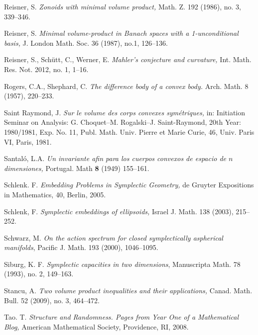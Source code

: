 \documentclass{icmart}
\theoremstyle{definition}
\begin{document}
\begin{thebibliography}{7}
 Reisner, S. {\it Zonoids with minimal volume product,} Math.
Z. 192 (1986), no. 3, 339--346.

 Reisner, S. {\it Minimal volume-product in Banach spaces with a
1-unconditional basis,} J. London Math. Soc. 36 (1987),  no.1, 126--136.

 Reisner, S., Sch\"utt, C., Werner, E. {\it Mahler's conjecture and curvature,}
Int. Math. Res. Not.  2012, no. 1, 1--16. 


 Rogers, C.A., Shephard, C. {\it The difference
body of a convex body.} Arch. Math. 8 (1957), 220--233.


 Saint Raymond, J. {\it Sur le volume des corps convexes
sym\'etriques,} in:  Initiation Seminar on Analysis: G. Choquet--M.
Rogalski--J. Saint-Raymond, 20th Year: 1980/1981, Exp. No. 11, Publ. Math. Univ. Pierre et Marie Curie, 46, Univ. Paris VI,
Paris, 1981.


 Santal\'o, L.A. {\it Un invariante afin para los cuerpos convexos de espacio de $n$ dimensiones,}
Portugal. Math {\bf 8} (1949) 155--161.

 Schlenk. F. {\it Embedding Problems in Symplectic Geometry,}  de Gruyter Expositions in Mathematics, 40, Berlin, 2005.

 Schlenk, F. {\it Symplectic embeddings of ellipsoids,}  Israel J. Math. 138 (2003), 215--252.


 Schwarz, M. {\it On the action spectrum for closed symplectically
aspherical manifolds}, Pacific J. Math. 193 (2000), 1046--1095.


 Siburg, K. F. {\it Symplectic capacities in two dimensions}, Manuscripta Math. 78 (1993), no. 2, 149--163. 

 Stancu, A. {\it Two volume product inequalities and their applications, } Canad. Math. Bull. 52 (2009), no. 3, 464--472. 

 Tao. T. %
{\it Structure and Randomness. Pages from Year One of a Mathematical Blog,} American Mathematical Society, Providence, RI, 2008.


\end{thebibliography}
\end{document}
